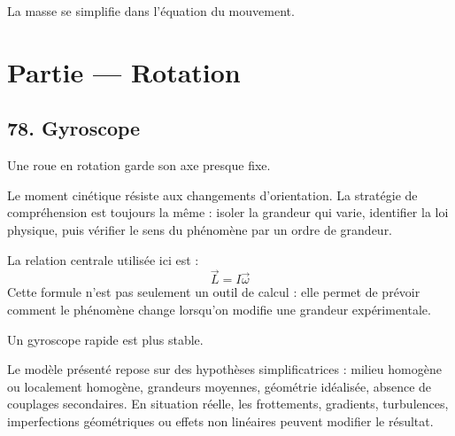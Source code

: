 \documentclass[11pt,a4paper]{article}
\begin{document}
\begin{corrigebox}[Indication]
La masse se simplifie dans l'équation du mouvement.
\end{corrigebox}


\section{Partie — Rotation}


\subsection{78. Gyroscope}

\begin{exemplebox}
Une roue en rotation garde son axe presque fixe.
\end{exemplebox}

\begin{methodebox}
Le moment cinétique résiste aux changements d'orientation.
La stratégie de compréhension est toujours la même : isoler la grandeur qui varie, identifier la loi physique, puis vérifier le sens du phénomène par un ordre de grandeur.
\end{methodebox}

\begin{theorembox}
La relation centrale utilisée ici est :
\[
\vec L=I\vec\omega
\]
Cette formule n'est pas seulement un outil de calcul : elle permet de prévoir comment le phénomène change lorsqu'on modifie une grandeur expérimentale.
\end{theorembox}

\begin{odgbox}
Un gyroscope rapide est plus stable.
\end{odgbox}

\begin{attentionbox}
Le modèle présenté repose sur des hypothèses simplificatrices : milieu homogène ou localement homogène, grandeurs moyennes, géométrie idéalisée, absence de couplages secondaires. En situation réelle, les frottements, gradients, turbulences, imperfections géométriques ou effets non linéaires peuvent modifier le résultat.
\end{attentionbox}
\end{document}
